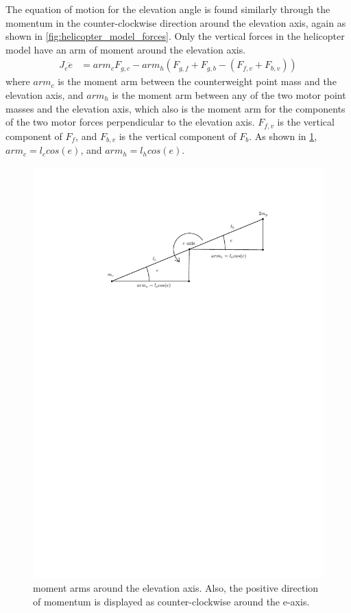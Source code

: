 The equation of motion for the elevation angle is found similarly through the momentum in the counter-clockwise direction around the elevation axis, again as shown in \cref{fig:helicopter_model_forces}. Only the vertical forces in the helicopter model have an arm of moment around the elevation axis.
\begin{align*}
  J_e\ddot{e} &= arm_cF_{g,c} - arm_h(F_{g,f}+F_{g,b} - (F_{f,v} + F_{b,v}))
\end{align*}
where $arm_c$ is the moment arm between the counterweight point mass and the elevation axis, and $arm_h$ is the moment arm between any of the two motor point masses and the elevation axis, which also is the moment arm for the components of the two motor forces perpendicular to the elevation axis. $F_{f,v}$ is the vertical component of $F_f$, and $F_{b,v}$ is the vertical component of $F_b$. As shown in \cref{fig:elevation_model}, $arm_c = l_ccos(e)$, and $arm_h = l_hcos(e)$.
\begin{figure}[H]
  \caption{moment arms around the elevation axis. Also, the positive direction of momentum is displayed as counter-clockwise around the e-axis.}
  \label{fig:elevation_model}
  \includegraphics[width=1\textwidth]{images/elevation_model}
\end{figure}
